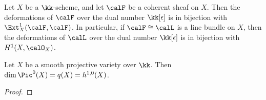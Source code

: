     \begin{theorem}\label{thm:deformations_of_coherent_sheaf_over_dual_number}
        Let \( X \) be a \( \kk \)-scheme, and let \( \calF \) be a coherent sheaf on \( X \). 
        Then the deformations of \( \calF \) over the dual number \( \kk[\epsilon] \) is in bijection with \( \Ext^1_X(\calF, \calF) \).
        In particular, if \(\calF \cong \calL\) is a line bundle on \( X \), then the deformations of \( \calL \) over the dual number \( \kk[\epsilon] \) is in bijection with \( H^1(X, \calO_X) \).
    \end{theorem}

    \begin{corollary}\label{cor:Pic0_and_h10_and_irregularity}
        Let \( X \) be a smooth projective variety over \( \kk \). 
        Then \(\dim \Pic^0(X) = q(X) = h^{1,0}(X)\).
    \end{corollary}
    \begin{proof}
    \end{proof}

